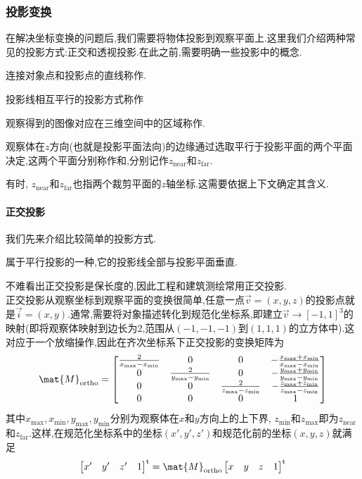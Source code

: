\documentclass{ctexart}
\begin{document}
\subsubsection{投影变换}
在解决坐标变换的问题后,我们需要将物体投影到观察平面上.这里我们介绍两种常见的投影方式:正交和透视投影.在此之前,需要明确一些投影中的概念.
\begin{definition}[投影线]
    连接对象点和投影点的直线称作.
\end{definition}
\begin{definition}[平行投影]
    投影线相互平行的投影方式称作
\end{definition}
\begin{definition}[(投影)观察体]
    观察得到的图像对应在三维空间中的区域称作.
\end{definition}
\begin{definition}[裁剪平面]
    观察体在$z$方向(也就是投影平面法向)的边缘通过选取平行于投影平面的两个平面决定,这两个平面分别称作和,分别记作$z_{\text{near}}$和$z_{\text{far}}$.
\end{definition}
有时, $z_{\text{near}}$和$z_{\text{far}}$也指两个裁剪平面的$z$轴坐标.这需要依据上下文确定其含义.
\paragraph{正交投影}
我们先来介绍比较简单的投影方式.
\begin{definition}[正交投影]
    属于平行投影的一种,它的投影线全部与投影平面垂直.
\end{definition}
不难看出正交投影是保长度的,因此工程和建筑测绘常用正交投影.\\
\indent 正交投影从观察坐标到观察平面的变换很简单,任意一点$\vec{v}=(x,y,z)$的投影点就是$\vec{i}=(x,y)$.通常,需要将对象描述转化到规范化坐标系,即建立$\vec{v}\to[-1,1]^3$的映射(即将观察体映射到边长为$2$,范围从$(-1,-1,-1)$到$(1,1,1)$的立方体中).这对应于一个放缩操作,因此在齐次坐标系下正交投影的变换矩阵为
\[\mat{M}_{\text{ortho}}=\begin{bmatrix}
    \frac{2}{x_{\max}-x_{\min}}&0&0&-\frac{x_{\max}+x_{\min}}{x_{\max}-x_{\min}}\\
    0&\frac{2}{y_{\max}-y_{\min}}&0&-\frac{y_{\max}+y_{\min}}{y_{\max}-y_{\min}}\\
    0&0&\frac{2}{z_{\max}-z_{\min}}&-\frac{z_{\max}+z_{\min}}{z_{\max}-z_{\min}}\\
    0&0&0&1
\end{bmatrix}\]
其中$x_{\max},x_{\min},y_{\max},y_{\min}$分别为观察体在$x$和$y$方向上的上下界, $z_{\min}$和$z_{\max}$即为$z_{\text{near}}$和$z_{\text{far}}$.这样,在规范化坐标系中的坐标$(x',y',z')$和规范化前的坐标$(x,y,z)$就满足
\[\begin{bmatrix}
    x'&y'&z'&1
\end{bmatrix}^{\text{t}}=\mat{M}_{\text{ortho}}\begin{bmatrix}
    x&y&z&1
\end{bmatrix}^{\text{t}}\]
\end{document}
